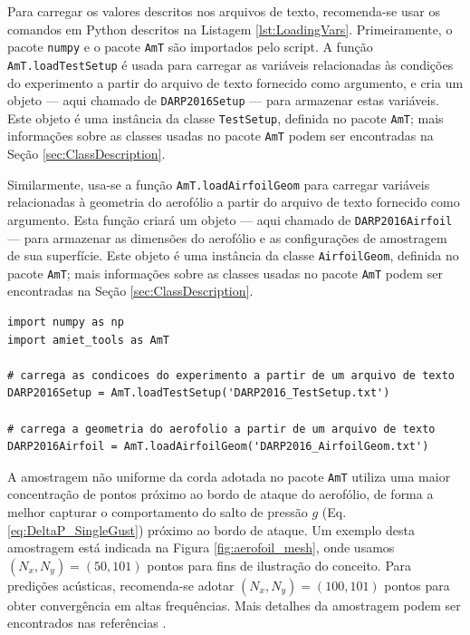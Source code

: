 \documentclass[a4paper, 11pt, twoside]{article}
\newcommand{\AmT}{\texttt{AmT}}
\begin{document}
Para carregar os valores descritos nos arquivos de texto, recomenda-se usar os comandos em Python descritos na Listagem \ref{lst:LoadingVars}. Primeiramente, o pacote \verb|numpy| e o pacote \AmT{} são importados pelo script. A função \verb|AmT.loadTestSetup| é usada para carregar as variáveis relacionadas às condições do experimento a partir do arquivo de texto fornecido como argumento, e cria um objeto --- aqui chamado de \verb|DARP2016Setup| --- para armazenar estas variáveis. Este objeto é uma instância da classe \verb|TestSetup|, definida no pacote \AmT{}; mais informações sobre as classes usadas no pacote \AmT{} podem ser encontradas na Seção \ref{sec:ClassDescription}.

Similarmente, usa-se a função \verb|AmT.loadAirfoilGeom| para carregar variáveis relacionadas à geometria do aerofólio a partir do arquivo de texto fornecido como argumento. Esta função criará um objeto --- aqui chamado de \verb|DARP2016Airfoil| --- para armazenar as dimensões do aerofólio e as configurações de amostragem de sua superfície. Este objeto é uma instância da classe \verb|AirfoilGeom|, definida no pacote \AmT{}; mais informações sobre as classes usadas no pacote \AmT{} podem ser encontradas na Seção \ref{sec:ClassDescription}.

\begin{lstlisting}[caption={Método recomendado para importar pacotes e carregar variáveis},label={lst:LoadingVars}]
import numpy as np
import amiet_tools as AmT

# carrega as condicoes do experimento a partir de um arquivo de texto
DARP2016Setup = AmT.loadTestSetup('DARP2016_TestSetup.txt')

# carrega a geometria do aerofolio a partir de um arquivo de texto
DARP2016Airfoil = AmT.loadAirfoilGeom('DARP2016_AirfoilGeom.txt')
\end{lstlisting}

A amostragem não uniforme da corda adotada no pacote \AmT{} utiliza uma maior concentração de pontos próximo ao bordo de ataque do aerofólio, de forma a melhor capturar o comportamento do salto de pressão $g$ (Eq. \ref{eq:DeltaP_SingleGust}) próximo ao bordo de ataque. Um exemplo desta amostragem está indicada na Figura \ref{fig:aerofoil_mesh}, onde usamos $(N_x, N_y) = (50, 101)$ pontos para fins de ilustração do conceito. Para predições acústicas, recomenda-se adotar $(N_x, N_y) = (100, 101)$ pontos para obter convergência em altas frequências. Mais detalhes da amostragem podem ser encontrados nas referências \cite{Casagrande18, Casagrande_etal2020}.
\end{document}
